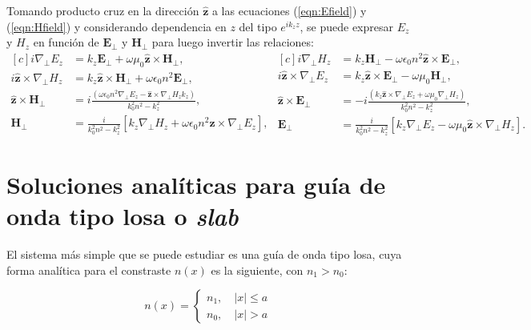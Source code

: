 Tomando producto cruz en la dirección $\hat{\textbf{z}}$ a las ecuaciones (\ref{eqn:Efield}) y (\ref{eqn:Hfield}) y considerando dependencia en $z$ del tipo $e^{ik_z z}$, se puede expresar $E_z$ y $H_z$ en función de $\textbf{E}_\perp$ y $\textbf{H}_\perp$ para luego invertir las relaciones: 
\begin{equation}
\begin{aligned}[c]
	 i\nabla_\perp E_z &= k_z\textbf{E}_\perp +\omega \mu_0 \hat{\textbf{z}} \times \textbf{H}_\perp  ,
	 	  	 \\
	 	  	i\hat{\textbf{z}} \times \nabla_\perp H_z &= k_z \hat{\textbf{z}} \times\textbf{H}_\perp + \omega\epsilon_0 n^2 \textbf{E}_\perp,
	 \\
	  \hat{\textbf{z}} \times \textbf{H}_\perp &= i\frac{(\omega\epsilon_0 n^2 \nabla_\perp E_z  - \hat{\textbf{z}} \times \nabla_\perp H_z k_z)}{k_0^2 n^2 - k_z^2},
	  \\
	  	 \textbf{H}_\perp &= \frac{i}{k_0^2 n^2 - k_z^2}\left[k_z\nabla_\perp H_z + \omega \epsilon_0 n^2\hat{\textbf{z}} \times \nabla_\perp E_z\right],
\end{aligned} 
\begin{aligned}[c]
	i \nabla_\perp H_z &= k_z \textbf{H}_\perp - \omega \epsilon_0 n^2  \hat{\textbf{z}} \times \textbf{E}_\perp ,
	\\
	i\hat{\textbf{z}} \times\nabla_\perp E_z &= k_z  \hat{\textbf{z}} \times \textbf{E}_\perp - \omega \mu_0 \textbf{H}_\perp,
	\\
	\hat{\textbf{z}} \times \textbf{E}_\perp &= -i\frac{(k_z\hat{\textbf{z}} \times \nabla_\perp E_z + \omega\mu_0 \nabla_\perp H_z)  }{k_0^2 n^2 - k_z^2},
	\\
	\textbf{E}_\perp &= \frac{i}{k_0^2 n^2 - k_z^2}\left[k_z \nabla_\perp E_z - \omega\mu_0 \hat{\textbf{z}} \times \nabla_\perp H_z\right]. \label{eqn:transversal}
\end{aligned}
\end{equation}
\section{Soluciones analíticas para guía de onda tipo losa o \textit{slab}}

El sistema más simple que se puede estudiar es una guía de onda tipo losa, cuya forma analítica para el constraste $n(x)$ es la siguiente, con $n_1 > n_0$:

\begin{equation*}
	n(x) = \left\{\begin{matrix}
	n_1, \quad |x| \le a
	\\
	n_0, \quad |x| > a
 	\end{matrix}\right.
\end{equation*}

